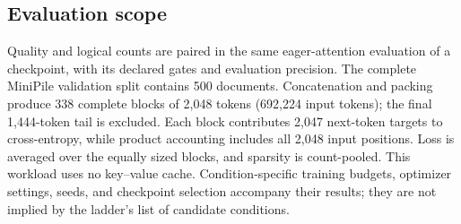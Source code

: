 \subsection{Evaluation scope}
\label{app:evaluation}

Quality and logical counts are paired in the same eager-attention evaluation
of a checkpoint, with its declared gates and evaluation precision. The complete
MiniPile validation split contains 500 documents. Concatenation and packing
produce 338 complete blocks of 2,048 tokens (692,224 input tokens); the final
1,444-token tail is excluded. Each block contributes 2,047 next-token targets
to cross-entropy, while product accounting includes all 2,048 input positions.
Loss is averaged over the equally sized blocks, and sparsity is count-pooled.
This workload uses no key--value cache. Condition-specific training budgets,
optimizer settings, seeds, and checkpoint selection accompany their results;
they are not implied by the ladder's list of candidate conditions.
